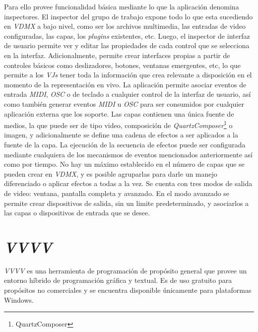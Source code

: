 Para ello provee funcionalidad básica mediante lo que la aplicación denomina inspectores. El inspector del grupo de trabajo expone todo lo que esta sucediendo en \emph{VDMX} a bajo nivel, como ser los archivos multimedia, las entradas de video configuradas, las capas, los \emph{plugins} existentes, etc. Luego, el inspector de interfaz de usuario permite ver y editar las propiedades de cada control que se selecciona en la interfaz. Adicionalmente, permite crear interfaces propias a partir de controles básicos como deslizadores, botones, ventanas emergentes, etc, lo que permite a los \emph{VJs} tener toda la información que crea relevante a disposición en el momento de la representación en vivo.
La aplicación permite asociar eventos de entrada \emph{MIDI}, \emph{OSC} o de teclado a cualquier control de la interfaz de usuario, así como también generar eventos \emph{MIDI} u \emph{OSC} para ser consumidos por cualquier aplicación externa que los soporte.
Las capas contienen una única fuente de medios, la que puede ser de tipo video, composición de \emph{QuartzComposer}\footnote{QuartzComposer} o imagen, y adicionalmente se define una cadena de efectos a ser aplicados a la fuente de la capa. La ejecución de la secuencia de efectos puede ser configurada mediante cualquiera de los mecanismos de eventos mencionados anteriormente así como por tiempo. No hay un máximo establecido en el número de capas que se pueden crear en \emph{VDMX}, y es posible agruparlas para darle un manejo diferenciado o aplicar efectos a todas a la vez.
Se cuenta con tres modos de salida de video: ventana, pantalla completa y avanzado. En el modo avanzado se permite crear dispositivos de salida, sin un limite predeterminado, y asociarlos a las capas o dispositivos de entrada que se desee.

\section{\emph{VVVV}}
\emph{VVVV}\cite{VVVV} es una herramienta de programación de propósito general que provee un entorno híbrido de programación gráfica y textual. Es de uso gratuito para propósitos no comerciales y se encuentra disponible únicamente para plataformas Windows.

